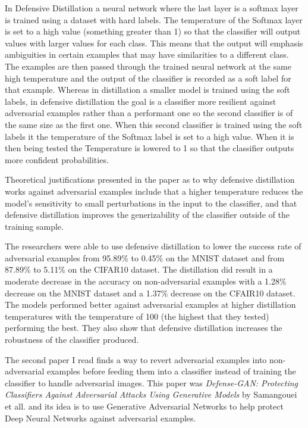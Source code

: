 \documentclass[../article.tex]{subfiles}
\begin{document}
In Defensive Distillation a neural network where the last layer is a softmax layer is trained using a dataset with hard labels. The temperature of the Softmax layer is set to a high value (something greater than 1) so that the classifier will output values with larger values for each class. This means that the output will emphasis ambiguities in certain examples that may have similarities to a different class. The examples are then passed through the trained neural network at the same high temperature and the output of the classifier is recorded as a soft label for that example. Whereas in distillation a smaller model is trained using the soft labels, in defensive distillation the goal is a classifier more resilient against adversarial examples rather than a performant one so the second classifier is of the same size as the first one. When this second classifier is trained using the soft labels it the temperature of the Softmax label is set to a high value. When it is then being tested the Temperature is lowered to 1 so that the classifier outputs more confident probabilities.

Theoretical justifications presented in the paper as to why defensive distillation works against adversarial examples include that a higher temperature reduces the model's sensitivity to small perturbations in the input to the classifier, and that defensive distillation improves the generizability of the classifier outside of the training sample.

The researchers were able to use defensive distillation to lower the success rate of adversarial examples from 95.89\% to 0.45\% on the MNIST dataset and from 87.89\% to 5.11\% on the CIFAR10 dataset. The distillation did result in a moderate decrease in the accuracy on non-adversarial examples with a 1.28\% decrease on the MNIST dataset and a 1.37\% decrease on the CFAIR10 dataset. The models performed better against adversarial examples at higher distillation temperatures with the temperature of 100 (the highest that they tested) performing the best. They also show that defensive distillation increases the robustness of the classifier produced.

The second paper I read finds a way to revert adversarial examples into non-adversarial examples before feeding them into a classifier instead of training the classifier to handle adversarial images. This paper was \emph{Defense-GAN: Protecting Classifiers Against Adversarial Attacks Using Generative Models} by Samangouei et all. and its idea is to use Generative Adversarial Networks to help protect Deep Neural Networks against adversarial examples.
\end{document}
